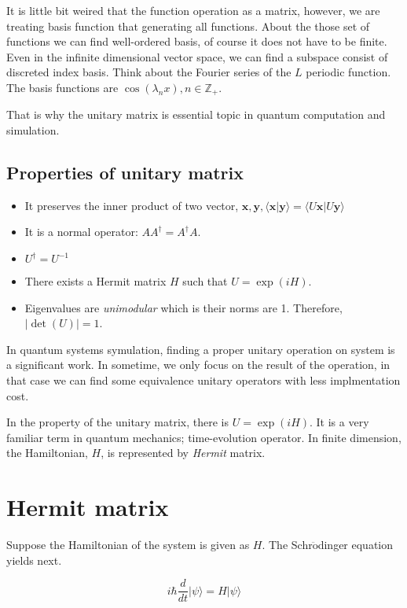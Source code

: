 It is little bit weired that the function operation as a matrix, however, we are treating basis function that generating all functions.
About the those set of functions we can find well-ordered basis, of course it does not have to be finite.
Even in the infinite dimensional vector space, we can find a subspace consist of discreted index basis.
Think about the Fourier series of the $L$ periodic function. 
The basis functions are $\cos(\lambda_n x), n \in \mathbb{Z}_+ $.

That is why the unitary matrix is essential topic in quantum computation and simulation.

\subsection{Properties of unitary matrix}

\begin{itemize}
    \item It preserves the inner product of two vector, $\mathbf{x,y}, \langle \mathbf{x |y }\rangle = \langle U \mathbf{x}| U \mathbf{y}\rangle$
    \item It is a normal operator: $A A^\dagger = A^\dagger A$.
    \item $U^\dagger = U^{-1}$
    \item There exists a Hermit matrix $H$ such that $U = \exp(i H)$.
    \item Eigenvalues are \textit{unimodular} which is their norms are 1. Therefore, $|\det(U)| =1$.
\end{itemize}

In quantum systems symulation, 
finding a proper unitary operation on system is a significant work.
In sometime, we only focus on the result of the operation, in that case 
we can find some equivalence unitary operators with less implmentation cost.

In the property of the unitary matrix, there is $U = \exp(i H)$. 
It is a very familiar term in quantum mechanics; time-evolution operator. 
In finite dimension, the Hamiltonian, $H$, is represented by \textit{Hermit} matrix.

\section{Hermit matrix}

Suppose the Hamiltonian of the system is given as $H$. The Schr$\ddot{\mbox{o}}$dinger  equation yields next.

\begin{equation}
    i \hbar \frac{d}{d t} | \psi \rangle = H | \psi \rangle
\end{equation}

